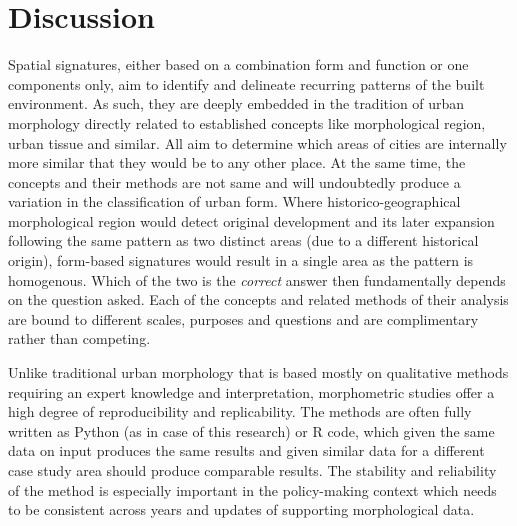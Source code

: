 \section{Discussion}
\label{sec:disc}

Spatial signatures, either based on a combination form and function or one components
only, aim to identify and delineate recurring patterns of the built environment. As
such, they are deeply embedded in the tradition of urban morphology directly related to
established concepts like morphological region, urban tissue and similar. All aim to
determine which areas of cities are internally more similar that they would be to any
other place. At the same time, the concepts and their methods are not same and will
undoubtedly produce a variation in the classification of urban form. Where
historico-geographical morphological region would detect original development and its later
expansion following the same pattern as two distinct areas (due to a different
historical origin), form-based signatures would result in a single area as the pattern
is homogenous. Which of the two is the \textit{correct} answer then fundamentally
depends on the question asked. Each of the concepts and related methods of their
analysis are bound to different scales, purposes and questions and are complimentary
rather than competing.


Unlike traditional urban morphology that is based mostly on qualitative methods requiring an
 expert knowledge and interpretation, morphometric studies offer a high
degree of reproducibility and replicability. The methods are often fully written as
Python (as in case of this research) or R code, which given the same data on input
produces the same results and given similar data for a different case study area should
produce comparable results. The stability and reliability of the method is especially
important in the policy-making context which needs to be consistent across years and
updates of supporting morphological data.


